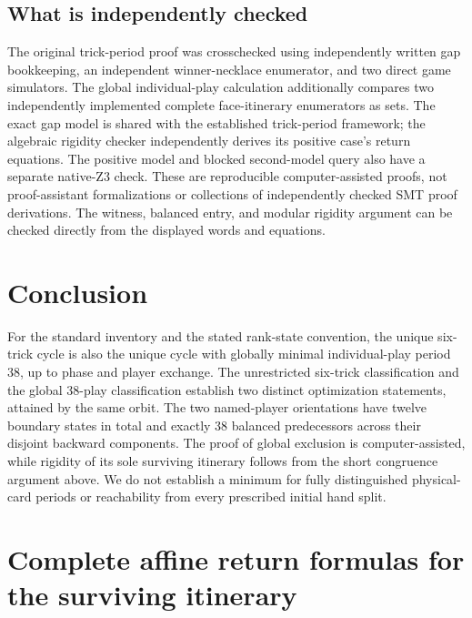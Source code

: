\documentclass[11pt]{article}
\begin{document}
\subsection{What is independently checked}

The original trick-period proof was crosschecked using independently written
gap bookkeeping, an independent winner-necklace enumerator, and two direct
game simulators. The global individual-play calculation additionally compares
two independently implemented complete face-itinerary enumerators as sets.
The exact gap model is shared with the established trick-period framework;
the algebraic rigidity checker independently derives its positive case's
return equations. The positive model and blocked second-model query also
have a separate native-Z3 check. These are reproducible computer-assisted
proofs, not proof-assistant formalizations or collections of independently
checked SMT proof derivations. The witness, balanced entry, and modular
rigidity argument can be checked directly from the displayed words and
equations.

\section{Conclusion}

For the standard inventory and the stated rank-state convention, the unique
six-trick cycle is also the unique cycle with globally minimal individual-play
period 38, up to phase and player exchange. The unrestricted six-trick
classification and the global 38-play classification establish two distinct
optimization statements, attained by the same orbit. The two named-player
orientations have twelve boundary states in total and exactly 38 balanced
predecessors across their disjoint backward components. The proof of global
exclusion is computer-assisted, while rigidity of its sole surviving
itinerary follows from the short congruence argument above. We do not
establish a minimum for fully distinguished physical-card periods or
reachability from every prescribed initial hand split.

\appendix
\section{Complete affine return formulas for the surviving itinerary}\label{app:affine}
\end{document}
